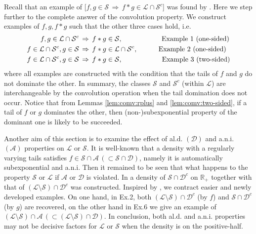 \documentclass[12pt,leqno]{amsart}
\newcommand{\R}{\mathbb{R}}
\newcommand{\cals}{{\mathcal S}}
\newcommand{\call}{{\mathcal L}}
\newcommand{\cala}{{\mathcal A}}
\newcommand{\cald}{{\mathcal D}}
\newcommand{\1}{{\mathbf 1}}
\begin{document}
Recall that an example of [$f,g\in \cals\, \Rightarrow\, f\ast g \in \call\cap \cals^c$] 
was found by \cite{Kluppelberg:Villasenor:1991}. Here we step further to 
the complete answer of the convolution property. We   
construct examples of $f,g,f\ast g$ such that the other three cases hold, i.e. 
\begin{align*}
f,g\in \call \cap \cals^c\, &\Rightarrow\, f\ast g \in \cals,\hspace{2cm} \text{Example 1 (one-sided)}\\ 
f\in \call \cap \cals^c ,g\in \cals \, &\Rightarrow\, f\ast g \in \call  \cap \cals^c, \hspace{0.95cm}\text{ Example 2 (one-sided)} \\
f\in \call \cap \cals^c ,g\in \cals\, &\Rightarrow\, f\ast g \in \cals, \hspace{1.9cm} \text{ Example 3 (two-sided)}
\end{align*}
where all examples are 
constructed with the condition that the tails of $f$ and $g$ do not dominate the other. 
In summary, the classes $\cals$ and $\cals^c$ (within $\call$) 
are interchangeable by the convolution operation when the tail domination does not occur. 
Notice that from Lemmas \ref{lem:comv:rplus} and \ref{lem:comv:two-sided}, %
if a tail of $f$ or $g$ dominates the other, then (non-)subexponential property of 
the dominant one is likely to be succeeded. 


Another aim of this section is to examine the effect of 
al.d. $(\cald)$ and a.n.i. $(\cala)$ properties on $\call$ or $\cals$.  
It is well-known that a density with a regularly varying tails satisfies 
$f\in \cals \cap \cala\, (\subset \cals\cap \cald)$, namely it is automatically subexponential 
and a.n.i. Then it remained to be seen that what happens to 
the property $\cals$ or $\call$ if $\cala$ or $\cald$ is violated. 
In \cite{Jiang:Wang:Cui:Chen:2019} a density of $\cals\cap\cald^c$ on $\R_+$ together with 
that of $(\call\setminus \cals) \cap \cald^c$ was constructed. Inspired by \cite{Jiang:Wang:Cui:Chen:2019}, we 
contract easier and newly developed examples.   
On one hand, in Ex.2, both $(\call\setminus \cals)\cap \cald^c$ (by $f$) and $\cals \cap \cald^c$ (by $g$) 
are recovered, on the other hand in Ex.6 we give an example of $(\call \setminus \cals) \cap \cala \,(\subset (\call \setminus \cals) \cap \cald)$. 
In conclusion, both al.d. and a.n.i. properties may not be decisive factors for $\call$ or $\cals$ when 
the density is on the positive-half.
\end{document}
